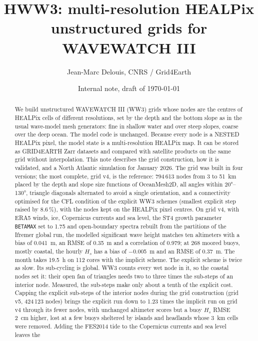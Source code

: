 \documentclass[11pt,a4paper]{article}
\title{HWW3: multi-resolution HEALPix unstructured grids for WAVEWATCH III}
\author{Jean-Marc Delouis, CNRS / Grid4Earth}
\date{Internal note, draft of \today}
\begin{document}
\maketitle

\begin{abstract}
We build unstructured WAVEWATCH III (WW3) grids whose nodes are the centres of
HEALPix cells of different resolutions, set by the depth and the bottom slope
as in the usual wave-model mesh generators: fine in shallow water and over
steep slopes, coarse over the deep ocean. The model code is unchanged. Because every node is a NESTED
HEALPix pixel, the model state is a multi-resolution HEALPix map. It can be
stored as GRID4EARTH Zarr datasets and compared with satellite products on
the same grid without interpolation. This note describes the grid
construction, how it is validated, and a North Atlantic simulation for
January 2026. The grid was built in four versions; the most complete,
grid v4, is the reference: 794\,613 nodes from 3 to \SI{51}{km} placed by
the depth and slope size functions of OceanMesh2D, all angles within
\ang{20}--\ang{130}, triangle diagonals alternated to avoid a single
orientation, and a connectivity optimised for the CFL condition of the
explicit WW3 schemes (smallest explicit step raised by 8.6\,\%), with the
nodes kept on the HEALPix pixel centres. On grid v4, with ERA5 winds, ice,
Copernicus currents and sea level, the ST4 growth parameter
\texttt{BETAMAX} set to 1.75 and open-boundary spectra rebuilt from the
partitions of the Ifremer global run, the modelled significant wave height
matches ten altimeters with a bias of \SI{+0.041}{m}, an RMSE of
\SI{0.35}{m} and a correlation of 0.979; at 268 moored buoys, mostly
coastal, the hourly $H_s$ has a bias of \SI{-0.005}{m} and an RMSE of
\SI{0.37}{m}. The month takes \SI{19.5}{h} on 112 cores with the implicit
scheme. The explicit scheme is twice as slow. Its sub-cycling is global.
WW3 counts every wet node in it, so the coastal nodes set it: their open
fan of triangles needs two to three times the sub-steps of an interior
node. Measured, the sub-steps make only about a tenth of the explicit
cost. Capping the explicit sub-steps of the interior nodes during the grid
construction (grid v5, 424\,123 nodes) brings the explicit run down to
1.23 times the implicit run on grid v4 through its fewer nodes, with
unchanged altimeter scores
but a buoy $H_s$ RMSE \SI{2}{cm} higher, lost at a few buoys sheltered by
islands and headlands whose \SI{3}{km} cells were removed.
Adding the FES2014 tide to the Copernicus currents and sea level leaves the

\end{abstract}
\end{document}

